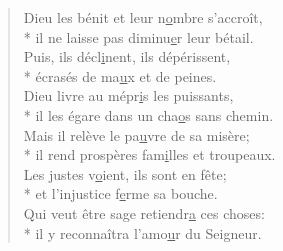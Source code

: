 \begin{verse}
Dieu les bénit et leur n\underline{o}mbre s’accroît, \\*
il ne laisse pas diminu\underline{e}r leur bétail. \\
Puis, ils décl\underline{i}nent, ils dépérissent, \\*
écrasés de ma\underline{u}x et de peines. \\

Dieu livre au mépr\underline{i}s les puissants, \\*
il les égare dans un cha\underline{o}s sans chemin. \\
Mais il relève le pa\underline{u}vre de sa misère; \\*
il rend prospères fam\underline{i}lles et troupeaux. \\

Les justes v\underline{o}ient, ils sont en fête; \\*
et l’injustice f\underline{e}rme sa bouche. \\
Qui veut être sage retiendr\underline{a} ces choses: \\*
il y reconnaîtra l’amo\underline{u}r du Seigneur. \\
\end{verse}

